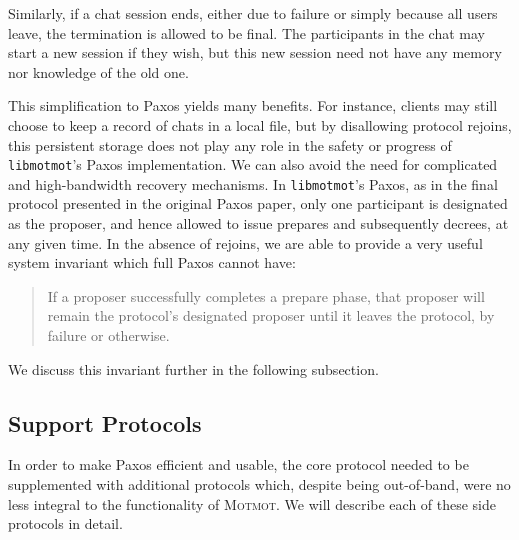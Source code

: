 \documentclass{sig-alternate}
\newcommand\Motmot{\textsc{Motmot}\xspace}
\newcommand\libmotmot{\texttt{libmotmot}\xspace}
\begin{document}
Similarly, if a chat session ends, either due to failure or simply because all
users leave, the termination is allowed to be final.  The participants in the
chat may start a new session if they wish, but this new session need not have
any memory nor knowledge of the old one.

This simplification to Paxos yields many benefits.  For instance, clients may
still choose to keep a record of chats in a local file, but by disallowing
protocol rejoins, this persistent storage does not play any role in the safety
or progress of \libmotmot's Paxos implementation.  We can also avoid the need
for complicated and high-bandwidth recovery mechanisms.  In \libmotmot's Paxos,
as in the final protocol presented in the original Paxos paper, only one
participant is designated as the proposer, and hence allowed to issue prepares
and subsequently decrees, at any given time.  In the absence of rejoins, we
are able to provide a very useful system invariant which full Paxos cannot
have:
\begin{quote}
  If a proposer successfully completes a prepare phase, that proposer will
  remain the protocol's designated proposer until it leaves the protocol, by
  failure or otherwise.
\end{quote}
We discuss this invariant further in the following subsection.

\subsection{Support Protocols}

In order to make Paxos efficient and usable, the core protocol needed to be
supplemented with additional protocols which, despite being out-of-band, were
no less integral to the functionality of \Motmot.  We will describe each of
these side protocols in detail.
\end{document}
